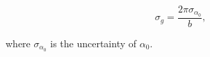 \documentclass{article}
\begin{document}
\begin{equation}
    \sigma_{g} = \frac{2\pi \sigma_{\alpha_{0}}}{b},
\end{equation}

where $\sigma_{\alpha_{0}}$ is the uncertainty of $\alpha_{0}$.



\end{document}
